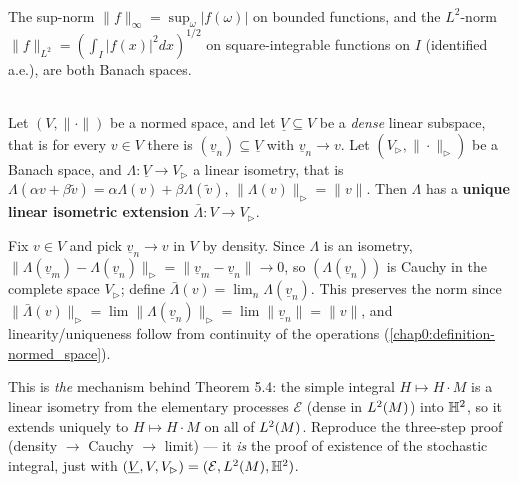 \begin{example}  \\
The sup-norm $\|f\|_\infty=\sup_\omega|f(\omega)|$ on bounded functions, and the $L^2$-norm $\|f\|_{L^2}=(\int_I|f(x)|^2dx)^{1/2}$ on square-integrable functions on $I$ (identified a.e.), are both Banach spaces.
\end{example}

\begin{theorem} \label{chap0:theorem-isometric_extension}  \\
Let $(V,\|\cdot\|)$ be a normed space, and let $\underline V\subseteq V$ be a \textit{dense} linear subspace, that is for every $v\in V$ there is $(\underline v_n)\subseteq\underline V$ with $\underline v_n\to v$. Let $(V_\rhd,\|\cdot\|_\rhd)$ be a Banach space, and $\Lambda:\underline V\to V_\rhd$ a linear isometry, that is $\Lambda(\alpha v+\beta\tilde v)=\alpha\Lambda(v)+\beta\Lambda(\tilde v)$, $\|\Lambda(v)\|_\rhd=\|v\|$. Then $\Lambda$ has a \textbf{unique linear isometric extension} $\bar\Lambda:V\to V_\rhd$.
\end{theorem}
\begin{proofidea}
Fix $v\in V$ and pick $\underline v_n\to v$ in $V$ by density. Since $\Lambda$ is an isometry, $\|\Lambda(\underline v_m)-\Lambda(\underline v_n)\|_\rhd=\|\underline v_m-\underline v_n\|\to0$, so $(\Lambda(\underline v_n))$ is Cauchy in the complete space $V_\rhd$; define $\bar\Lambda(v)=\lim_n\Lambda(\underline v_n)$. This preserves the norm since $\|\bar\Lambda(v)\|_\rhd=\lim\|\Lambda(\underline v_n)\|_\rhd=\lim\|\underline v_n\|=\|v\|$, and linearity/uniqueness follow from continuity of the operations (\cref{chap0:definition-normed_space}).
\end{proofidea}
\begin{quizbox} This is \emph{the} mechanism behind Theorem 5.4: the simple integral $H\mapsto H\cdot M$ is a linear isometry from the elementary processes $\mathcal E$ (dense in $L^2(M)$) into $\mathbb{H}^2$, so it extends uniquely to $H\mapsto H\cdot M$ on all of $L^2(M)$. Reproduce the three-step proof (density $\to$ Cauchy $\to$ limit) --- it \emph{is} the proof of existence of the stochastic integral, just with $(\underline V,V,V_\rhd)=(\mathcal E,L^2(M),\mathbb{H}^2)$. \end{quizbox}

